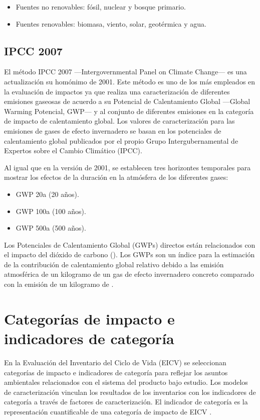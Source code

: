 \begin{itemize}
  \item Fuentes no renovables: fósil, nuclear y bosque primario.
  \item Fuentes renovables: biomasa, viento, solar, geotérmica y agua.
\end{itemize}

\subsection{IPCC 2007}

El método IPCC 2007 —Intergovernmental Panel on Climate Change— es una actualización su homónimo de 2001. Este método es uno de los más empleados en la evaluación de impactos ya que realiza una caracterización de diferentes emisiones gaseosas de acuerdo a su Potencial de Calentamiento Global —Global Warming Potencial, GWP— y al conjunto de diferentes emisiones en la categoría de impacto de calentamiento global. Los valores de caracterización para las emisiones de gases de efecto invernadero se basan en los potenciales de calentamiento global publicados por el propio Grupo Intergubernamental de Expertos sobre el Cambio Climático (IPCC).

Al igual que en la versión de 2001, se establecen tres horizontes temporales para mostrar los efectos de la duración en la atmósfera de los diferentes gases:

\begin{itemize}
  \item GWP 20a (20 años).
  \item GWP 100a (100 años).
  \item GWP 500a (500 años).
\end{itemize}

Los Potenciales de Calentamiento Global (GWPs) directos están relacionados con el impacto del dióxido de carbono (). Los GWPs son un índice para la estimación de la contribución de calentamiento global relativo debido a las emisión atmosférica de un kilogramo de un gas de efecto invernadero concreto comparado con la emisión de un kilogramo de  \cite{ecoinventlcia}.

\section{Categorías de impacto e indicadores de categoría}\label{sec:catimpactos}

En la Evaluación del Inventario del Ciclo de Vida (EICV) se seleccionan categorías de impacto e indicadores de categoría para reflejar los asuntos ambientales relacionados con el sistema del producto bajo estudio. Los modelos de caracterización vinculan los resultados de los inventarios con los indicadores de categoría a través de factores de caracterización. El indicador de categoría es la representación cuantificable de una categoría de impacto de EICV \cite{niembro}.

